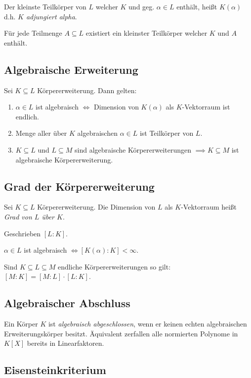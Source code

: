 Der kleinste Teilkörper von $L$ welcher $K$ und geg. $\alpha \in L$ enthält, heißt $K(\alpha)$ d.h. \emph{$K$ adjungiert alpha}.

Für jede Teilmenge $A \subseteq L$ existiert ein kleinster Teilkörper welcher $K$ und $A$ enthält.

\subsection*{Algebraische Erweiterung}

Sei $K \subseteq L$ Körpererweiterung. Dann gelten:

\begin{enumerate}[label=(\alph*)]
	\item $\alpha \in L$ ist algebraisch $\iff$ Dimension von $K(\alpha)$ als $K$-Vektorraum ist endlich.
	\item Menge aller über $K$ algebraischen $\alpha \in L$ ist Teilkörper von $L$.
	\item $K \subseteq L$ und $L \subseteq M$ sind algebraische Körpererweiterungen $\implies K \subseteq M$ ist algebraische Körpererweiterung.
\end{enumerate}

\subsection*{Grad der Körpererweiterung}

Sei $K \subseteq L$ Körpererweiterung. Die Dimension von $L$ als $K$-Vektorraum heißt \emph{Grad von $L$ über $K$}.

Geschrieben $[L : K]$.

$\alpha \in L$ ist algebraisch $\iff [K(\alpha) : K] < \infty$.

\vspace*{1mm}

Sind $K \subseteq L \subseteq M$ endliche Körpererweiterungen so gilt: $[M : K] = [M : L] \cdot [L : K]$.

\subsection*{Algebraischer Abschluss}

Ein Körper $K$ ist \emph{algebraisch abgeschlossen}, wenn er keinen echten algebraischen Erweiterungskörper besitzt. Äquivalent zerfallen alle normierten Polynome in $K[X]$ bereits in Linearfaktoren.

\subsection*{Eisensteinkriterium}

